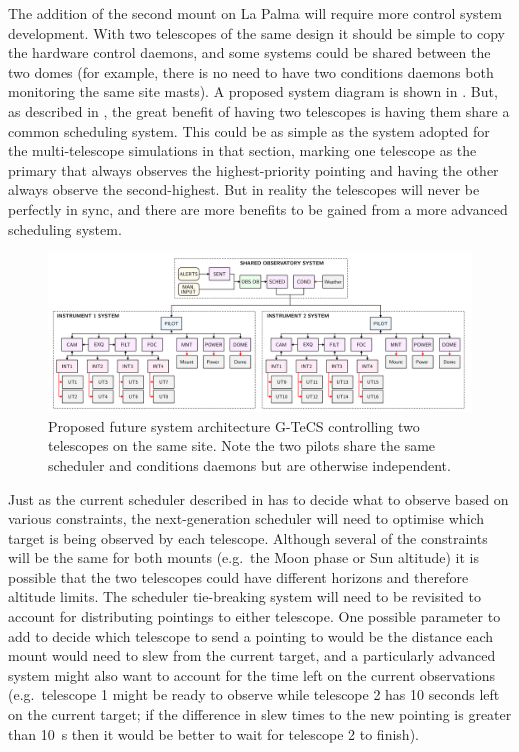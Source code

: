 \begin{colsection}
\begin{colsection}
The addition of the second mount on La Palma will require more control system development. With two telescopes of the same design it should be simple to copy the hardware control daemons, and some systems could be shared between the two domes (for example, there is no need to have two conditions daemons both monitoring the same site masts). A proposed system diagram is shown in . But, as described in , the great benefit of having two telescopes is having them share a common scheduling system. This could be as simple as the system adopted for the multi-telescope simulations in that section, marking one telescope as the primary that always observes the highest-priority pointing and having the other always observe the second-highest. But in reality the telescopes will never be perfectly in sync, and there are more benefits to be gained from a more advanced scheduling system.

\begin{figure}[t]
    \begin{center}
        \includegraphics[width=\linewidth]{images/flow2.pdf}
    \end{center}
    \caption[Future G-TeCS system architecture for two telescopes]{
        Proposed future system architecture G-TeCS controlling two telescopes on the same site. Note the two pilots share the same scheduler and conditions daemons but are otherwise independent.
    }\label{fig:flow2}
\end{figure}

Just as the current scheduler described in  has to decide what to observe based on various constraints, the next-generation scheduler will need to optimise which target is being observed by each telescope. Although several of the constraints will be the same for both mounts (e.g.\ the Moon phase or Sun altitude) it is possible that the two telescopes could have different horizons and therefore altitude limits. The scheduler tie-breaking system will need to be revisited to account for distributing pointings to either telescope. One possible parameter to add to decide which telescope to send a pointing to would be the distance each mount would need to slew from the current target, and a particularly advanced system might also want to account for the time left on the current observations (e.g.\ telescope 1 might be ready to observe while telescope 2 has 10 seconds left on the current target; if the difference in slew times to the new pointing is greater than \SI{10}{\second} then it would be better to wait for telescope 2 to finish).


\end{colsection}
\end{colsection}

